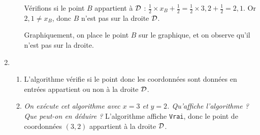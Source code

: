 \documentclass[11pt]{article}
\begin{document}
\begin{exercice}
\begin{enumerate}
\begin{enumerate}
          Vérifions si le point $B$ appartient à $\cal D$ : $\frac{1}{2}\times x_B+\frac{1}{2}=\frac{1}{2}\times3,2+\frac{1}{2}=2,1$. Or $2,1\neq x_B$, donc $B$ n'est pas sur la droite $\cal D$.

          Graphiquement, on place le point $B$ sur le graphique, et on observe qu'il n'est pas sur la droite.
      \end{enumerate}
    \item \begin{enumerate}
        \item L'algorithme vérifie si le point donc les coordonnées sont données en entrées appartient ou non à la droite $\cal D$.
        \item \emph{On exécute cet algorithme avec $x=3$ et $y=2$. Qu'affiche l'algorithme ? Que peut-on en déduire ?} L'algorithme affiche \texttt{Vrai}, donc le point de coordonnées $(3,2)$ appartient à la droite $\cal D$.
      \end{enumerate}
  \end{enumerate}
\end{exercice}
\end{document}
